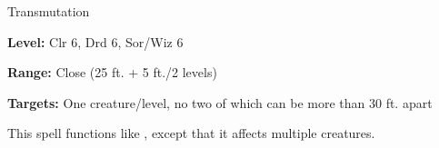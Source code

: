 \label{spell:Mass Bull's Strength}

Transmutation

\textbf{Level:} Clr 6, Drd 6, Sor/Wiz 6

\textbf{Range:} Close (25 ft. + 5 ft./2 levels)

\textbf{Targets:} One creature/level, no two of which can be more than 30 ft. apart

This spell functions like , except that it affects multiple 
creatures.

